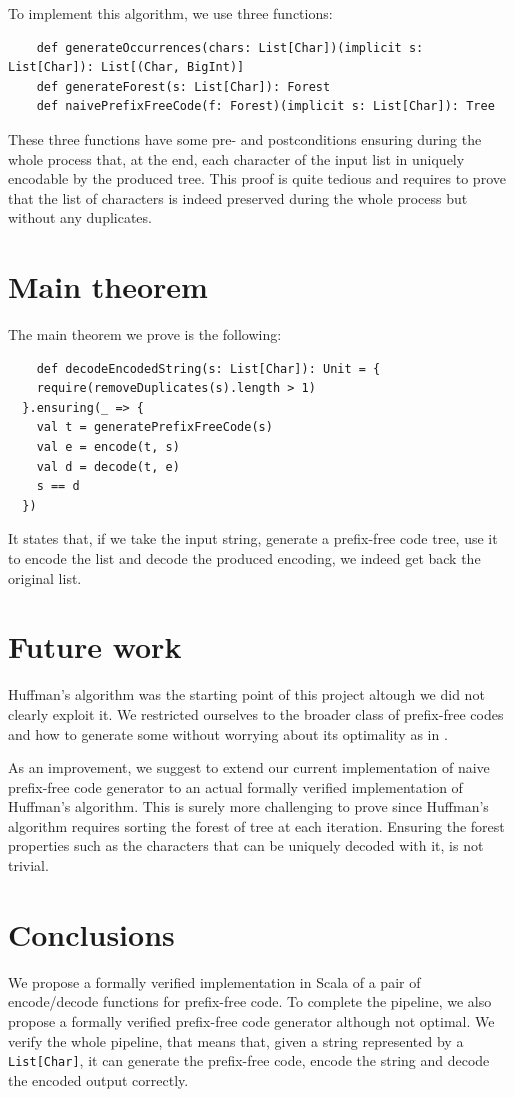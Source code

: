 \documentclass[a4paper,UKenglish,cleveref, autoref, thm-restate]{lipics-v2021}
\begin{document}
To implement this algorithm, we use three functions:
\begin{lstlisting}
    def generateOccurrences(chars: List[Char])(implicit s: List[Char]): List[(Char, BigInt)]
    def generateForest(s: List[Char]): Forest
    def naivePrefixFreeCode(f: Forest)(implicit s: List[Char]): Tree
\end{lstlisting}

These three functions have some pre- and postconditions ensuring during the whole process that, at the end, each character of the input list in uniquely encodable by the produced tree.
This proof is quite tedious and requires to prove that the list of characters is indeed preserved during the whole process but without any duplicates.

\section{Main theorem}
The main theorem we prove is the following:
\begin{lstlisting}
    def decodeEncodedString(s: List[Char]): Unit = {
    require(removeDuplicates(s).length > 1)
  }.ensuring(_ => {
    val t = generatePrefixFreeCode(s)
    val e = encode(t, s)
    val d = decode(t, e)
    s == d
  })
\end{lstlisting}

It states that, if we take the input string, generate a prefix-free code tree, use it to encode the list and decode the produced encoding, we indeed get back the original list.

\section{Future work}

Huffman's algorithm was the starting point of this project altough we did not clearly exploit it. We restricted ourselves to the broader class of prefix-free codes and how to generate some without worrying about its optimality as in \cite{blanchette}. 

As an improvement, we suggest to extend our current implementation of naive prefix-free code generator to an actual formally verified implementation of Huffman's algorithm. This is surely more challenging to prove since Huffman's algorithm requires sorting the forest of tree at each iteration. Ensuring the forest properties such as the characters that can be uniquely decoded with it, is not trivial.

\section{Conclusions}
We propose a formally verified implementation in Scala of a pair of encode/decode functions for prefix-free code. To complete the pipeline, we also propose a formally verified prefix-free code generator although not optimal.
We verify the whole pipeline, that means that, given a string represented by a \lstinline{List[Char]}, it can generate the prefix-free code, encode the string and decode the encoded output correctly.
\end{document}
